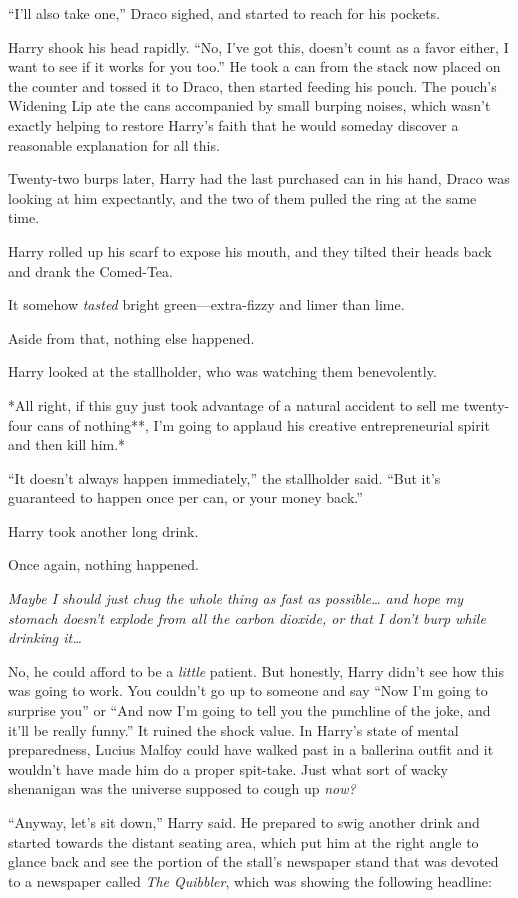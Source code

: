 ``I'll also take one,'' Draco sighed, and started to reach for his
pockets.

Harry shook his head rapidly. ``No, I've got this, doesn't count as a
favor either, I want to see if it works for you too.'' He took a can
from the stack now placed on the counter and tossed it to Draco, then
started feeding his pouch. The pouch's Widening Lip ate the cans
accompanied by small burping noises, which wasn't exactly helping to
restore Harry's faith that he would someday discover a reasonable
explanation for all this.

Twenty-two burps later, Harry had the last purchased can in his hand,
Draco was looking at him expectantly, and the two of them pulled the
ring at the same time.

Harry rolled up his scarf to expose his mouth, and they tilted their
heads back and drank the Comed-Tea.

It somehow \emph{tasted} bright green---extra-fizzy and limer than lime.

Aside from that, nothing else happened.

Harry looked at the stallholder, who was watching them benevolently.

*All right, if this guy just took advantage of a natural accident to
sell me twenty-four cans of nothing**, I'm going to applaud his creative
entrepreneurial spirit and then kill him.*

``It doesn't always happen immediately,'' the stallholder said. ``But
it's guaranteed to happen once per can, or your money back.''

Harry took another long drink.

Once again, nothing happened.

\emph{Maybe I should just chug the whole thing as fast as
possible\ldots{} and hope my stomach doesn't explode from all the carbon
dioxide, or that I don't burp while drinking it\ldots{}}

No, he could afford to be a \emph{little} patient. But honestly, Harry
didn't see how this was going to work. You couldn't go up to someone and
say ``Now I'm going to surprise you'' or ``And now I'm going to tell you
the punchline of the joke, and it'll be really funny.'' It ruined the
shock value. In Harry's state of mental preparedness, Lucius Malfoy
could have walked past in a ballerina outfit and it wouldn't have made
him do a proper spit-take. Just what sort of wacky shenanigan was the
universe supposed to cough up \emph{now?}

``Anyway, let's sit down,'' Harry said. He prepared to swig another
drink and started towards the distant seating area, which put him at the
right angle to glance back and see the portion of the stall's newspaper
stand that was devoted to a newspaper called \emph{The Quibbler}, which
was showing the following headline:

